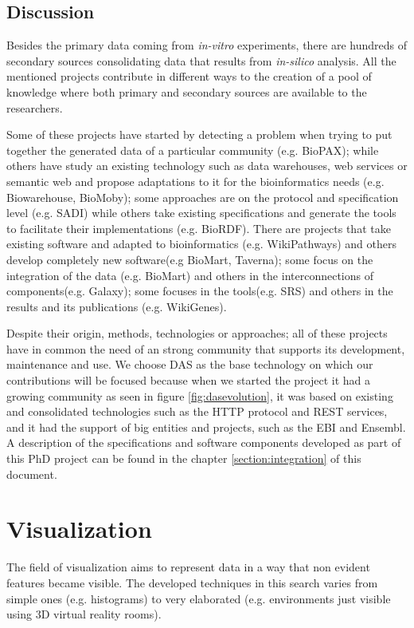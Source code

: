 \subsection{Discussion}
Besides the primary data coming from \emph{in-vitro} experiments, there are hundreds of secondary sources consolidating data that results from \emph{in-silico} analysis. All the mentioned projects contribute in different ways to the creation of a pool of knowledge where both primary and secondary sources are available to the researchers.

Some of these projects have started by detecting a problem when trying to put together the generated data of a particular community (e.g. BioPAX); while others have study an existing technology such as data warehouses, web services or semantic web and propose adaptations to it for the bioinformatics needs (e.g. Biowarehouse, BioMoby); some approaches are on the protocol and specification level (e.g. SADI) while others take existing specifications and generate the tools to facilitate their implementations (e.g. BioRDF). There are projects that take existing software and adapted to bioinformatics (e.g. WikiPathways) and others develop completely new software(e.g BioMart, Taverna); some focus on the integration of the data (e.g. BioMart) and others in the interconnections of components(e.g. Galaxy); some focuses in the tools(e.g. SRS) and others in the results and its publications (e.g. WikiGenes). 

Despite their origin, methods, technologies or approaches; all of these projects have in common the need of an strong community that supports its development, maintenance and use. We choose DAS as the base technology on which our contributions will be focused because when we started the project it had a growing community as seen in figure \ref{fig:dasevolution}, it was based on existing and consolidated technologies such as the HTTP protocol and REST services, and it had the support of big entities and projects, such as the EBI and Ensembl. A description of the specifications and software components developed as part of this PhD project can be found in the chapter \ref{section:integration} of this document.

\section{Visualization}
The field of visualization aims to represent data in a way that non evident features became visible. The developed techniques in this search varies from simple ones (e.g. histograms) to very elaborated (e.g. environments just visible using 3D virtual reality rooms).

